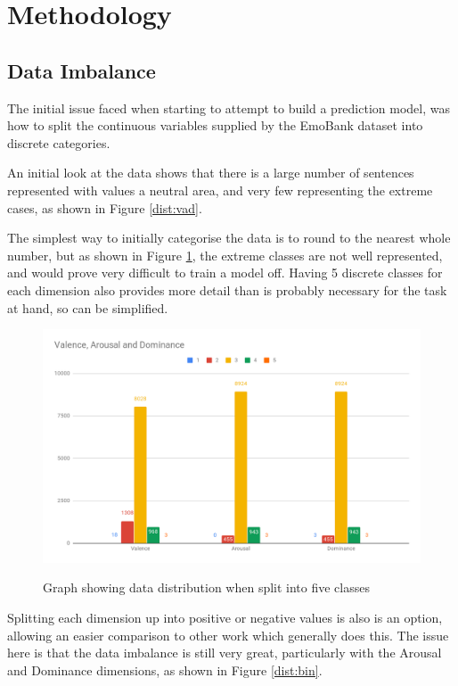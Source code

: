    
\section{Methodology}
\subsection{Data Imbalance}

The initial issue faced when starting to attempt to build a prediction model, was how to split the continuous variables supplied by the EmoBank dataset into discrete categories.

An initial look at the data shows that there is a large number of sentences represented with values a neutral area, and very few representing the extreme cases, as shown in Figure \ref{dist:vad}.

The simplest way to initially categorise the data is to round to the nearest whole number, but as shown in Figure \ref{dist:5cat}, the extreme classes are not well represented, and would prove very difficult to train a model off. Having 5 discrete classes for each dimension also provides more detail than is probably necessary for the task at hand, so can be simplified.

\begin{figure}[h]
\caption{Graph showing data distribution when split into five classes}
\centering
\includegraphics[scale=0.3]{graphs/5catDist.png}
\label{dist:5cat}
\end{figure}

Splitting each dimension up into positive or negative values is also is an option, allowing an easier comparison to other work which generally does this. The issue here is that the data imbalance is still very great, particularly with the Arousal and Dominance dimensions, as shown in Figure \ref{dist:bin}.

